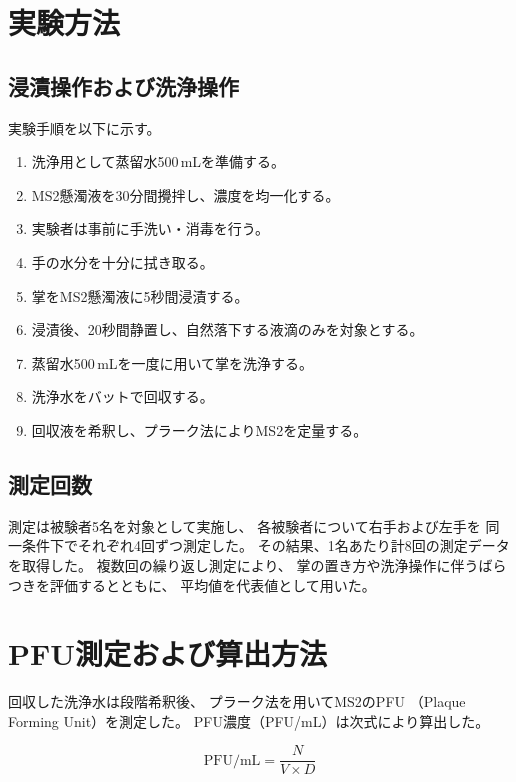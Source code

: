 
\section{実験方法}

\subsection{浸漬操作および洗浄操作}
実験手順を以下に示す。
\begin{enumerate}
  \item 洗浄用として蒸留水500\,mLを準備する。
  \item MS2懸濁液を30分間攪拌し、濃度を均一化する。
  \item 実験者は事前に手洗い・消毒を行う。
  \item 手の水分を十分に拭き取る。
  \item 掌をMS2懸濁液に5秒間浸漬する。
  \item 浸漬後、20秒間静置し、自然落下する液滴のみを対象とする。
  \item 蒸留水500\,mLを一度に用いて掌を洗浄する。
  \item 洗浄水をバットで回収する。
  \item 回収液を希釈し、プラーク法によりMS2を定量する。
\end{enumerate}

\subsection{測定回数}
測定は被験者5名を対象として実施し、
各被験者について右手および左手を
同一条件下でそれぞれ4回ずつ測定した。
その結果、1名あたり計8回の測定データを取得した。
複数回の繰り返し測定により、
掌の置き方や洗浄操作に伴うばらつきを評価するとともに、
平均値を代表値として用いた。


\section{PFU測定および算出方法}
回収した洗浄水は段階希釈後、
プラーク法を用いてMS2のPFU
（Plaque Forming Unit）を測定した。
PFU濃度（PFU/mL）は次式により算出した。

\begin{equation}
\mathrm{PFU/mL} = \frac{N}{V \times D}
\end{equation}

